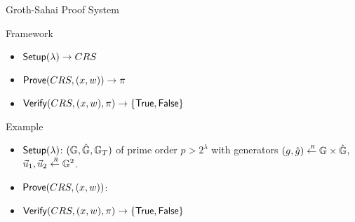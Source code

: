\begin{frame}{Groth-Sahai Proof System}
  \begin{block}{Framework}
    \begin{itemize}
    \item ${\mathsf{Setup}}(\lambda) \to CRS$
    \item ${\mathsf{Prove}}(CRS, (x, w)) \to \pi$
    \item ${\mathsf{Verify}}(CRS, (x,w), \pi) \to \{\mathsf{True}, \mathsf{False}\}$
    \end{itemize}
  \end{block}


  \begin{block}{Example}
    \begin{itemize}
    \item ${\mathsf{Setup}}(\lambda)$:  $(\mathbb{G}, \hat{\mathbb{G}}, \mathbb{G}_T)$ of prime order $p > 2^\lambda$ with generators $(g,\hat{g}) \stackrel{{\scriptscriptstyle \mkern4mu R}}{\gets} \mathbb{G} \times \hat{\mathbb{G}}$, $\vec{u}_1, \vec{u}_2 \stackrel{{\scriptscriptstyle \mkern4mu R}}{\gets} \mathbb{G}^2$.
    \item ${\mathsf{Prove}}(CRS, (x, w))$: 
    \item ${\mathsf{Verify}}(CRS, (x,w), \pi) \to \{\mathsf{True}, \mathsf{False}\}$
    \end{itemize}
  \end{block}
\end{frame}





